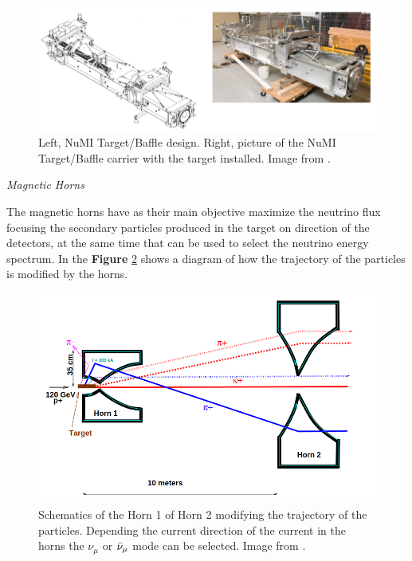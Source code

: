  \begin{figure}[!htb]
\centering
\includegraphics[scale=0.33]{Figures/Chapter2/TargetCarrier.png}
        \caption{Left, NuMI Target/Baffle design. Right, picture of the NuMI Target/Baffle carrier with the target installed. Image from \cite{NuMITarget}.} 
\label{fig:MnvExp:NuMI:NuMITargetCarrier}
\end{figure}

\textit{Magnetic Horns}

The magnetic horns have as their main objective maximize the neutrino flux focusing the secondary particles produced in the target on direction of the detectors, at the same time that can be used to select the neutrino energy spectrum. In the \textbf{Figure} \ref{fig:MnvExp:NuMI:HornsFocusSystem} shows a diagram of how the trajectory of the particles is modified by the horns. 

\begin{figure}[!htb]
\centering
\includegraphics[scale=0.33]{Figures/Chapter2/HornsFocusSystem.png}
        \caption{Schematics of the Horn 1 of Horn 2 modifying the trajectory of the particles. Depending the current direction of the current in the horns the $\nu_\mu$ or $\Bar{\nu}_\mu$ mode can be selected. Image from \cite{Numi}.} 
\label{fig:MnvExp:NuMI:HornsFocusSystem}
\end{figure}

